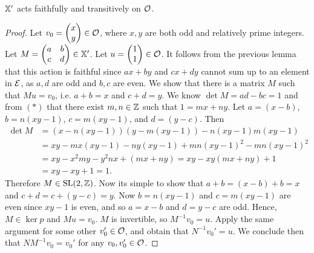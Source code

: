\documentclass[]{article}
\begin{document}
\begin{lem}
$\mathbb{X}'$ acts faithfully and transitively on $\mathcal{O}$.
\begin{proof}
Let $v_0=\begin{pmatrix}x \\ y\end{pmatrix}\in\mathcal{O}$, where $x,y$ are both odd and relatively prime integers. Let $M=\begin{pmatrix}a & b \\ c & d
\end{pmatrix}\in\mathbb{X}'$. Let $u=\begin{pmatrix}1 \\ 1 \end{pmatrix}\in\mathcal{O}$. It follows from the previous lemma that this action is faithful since $ax+by$ and $cx+dy$ cannot sum up to an element in $\mathcal{E}$, as $a,d$ are odd and $b,c$ are even. We show that there is a matrix $M$ such that $Mu=v_0$, i.e. $a+b=x$ and $c+d=y$. We know $\det M=ad-bc=1$ and from $(*)$ that there exist $m,n\in\mathbb{Z}$ such that $1=mx+ny$. Let $a=(x-b)$, $b=n(xy-1)$, $c=m(xy-1)$, and $d=(y-c)$. Then
\begin{align*}
\det M&=(x-n(xy-1))(y-m(xy-1))-n(xy-1)m(xy-1)\\
&=xy-mx(xy-1)-ny(xy-1)+mn(xy-1)^2-mn(xy-1)^2\\
&=xy-x^2my-y^2nx+(mx+ny)=xy-xy(mx+ny)+1\\
&=xy-xy+1=1.
\end{align*}
Therefore $M\in\mathrm{SL}(2,\mathbb{Z})$. Now its simple to show that $a+b=(x-b)+b=x$ and $c+d=c+(y-c)=y$. Now $b=n(xy-1)$ and $c=m(xy-1)$ are even since $xy-1$ is even, and so $a=x-b$ and $d=y-c$ are odd. Hence, $M\in\ker p$ and $Mu=v_0$. $M$ is invertible, so $M^{-1}v_0=u.$ Apply the same argument for some other $v_0'\in\mathcal{O}$, and obtain that $N^{-1}v_0'=u.$ We conclude then that $NM^{-1}v_0=v_0'$ for any $v_0,v_0'\in\mathcal{O}$.
\end{proof}
\end{lem}
\end{document}
